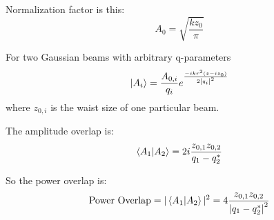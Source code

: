 \begin{appendices}
	Normalization factor is this:
	\begin{equation}
	A_0 = \sqrt{\frac{k z_0}{\pi}}
	\end{equation}

	For two Gaussian beams with arbitrary q-parameters
	\begin{equation}
	\ket{A_i} = \frac{A_{0,i}}{q_i} e^{ \frac{-ikr^2(z-iz_0)}{2\abs{q_i}^2 }}
	\end{equation}
	where $z_{0,i}$ is the waist size of one particular beam.
	
	The amplitude overlap is:
	\begin{equation}
	\braket{A_1|A_2} = 2 i  \frac{ z_{0,1}z_{0,2}}{q_1 - q_2^*}
	\end{equation}
	
	So the power overlap is:
	\begin{equation}
	\text{Power Overlap} = \vert \braket{A_1|A_2} \vert^2 = 4 \frac{ z_{0,1}z_{0,2}}{\abs{q_1 - q_2^*}^2}
	\end{equation}


\end{appendices} 
